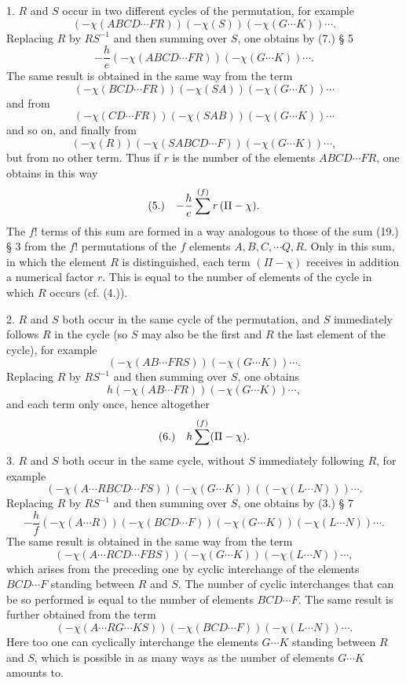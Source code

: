 \documentclass[11pt]{article}
\makeatletter
\newcommand{\frobtagc}[2]{\[\begin{array}{@{}r@{\quad}c@{}}\textup{(#1)} & \displaystyle #2\end{array}\]}
\makeatother
\begin{document}
1. $R$ and $S$ occur in two different cycles of the permutation, for example
\[
(-\chi(ABCD\cdots FR))(-\chi(S))(-\chi(G\cdots K))\cdots .
\]
Replacing $R$ by $RS^{-1}$ and then summing over $S$, one obtains by (7.) § 5
\[
-\frac{h}{e}(-\chi(ABCD\cdots FR))(-\chi(G\cdots K))\cdots .
\]
The same result is obtained in the same way from the term
\[
(-\chi(BCD\cdots FR))(-\chi(SA))(-\chi(G\cdots K))\cdots
\]
and from
\[
(-\chi(CD\cdots FR))(-\chi(SAB))(-\chi(G\cdots K))\cdots
\]
and so on, and finally from
\[
(-\chi(R))(-\chi(SABCD\cdots F))(-\chi(G\cdots K))\cdots,
\]
but from no other term. Thus if $r$ is the number of the elements $ABCD\cdots FR$, one obtains in this way
\frobtagc{5.}{-\frac{h}{e}\sum^{(f)}r\,(\Pi-\chi).}
The $f!$ terms of this sum are formed in a way analogous to those of the sum (19.) § 3 from the $f!$ permutations of the $f$ elements $A,B,C,\cdots Q,R$. Only in this sum, in which the element $R$ is distinguished, each term $(\Pi-\chi)$ receives in addition a numerical factor $r$. This is equal to the number of elements of the cycle in which $R$ occurs (cf. (4.)).

2. $R$ and $S$ both occur in the same cycle of the permutation, and $S$ immediately follows $R$ in the cycle (so $S$ may also be the first and $R$ the last element of the cycle), for example
\[
(-\chi(AB\cdots FRS))(-\chi(G\cdots K))\cdots .
\]
Replacing $R$ by $RS^{-1}$ and then summing over $S$, one obtains
\[
h(-\chi(AB\cdots FR))(-\chi(G\cdots K))\cdots,
\]
and each term only once, hence altogether
\frobtagc{6.}{h\sum^{(f)}(\Pi-\chi).}
3. $R$ and $S$ both occur in the same cycle, without $S$ immediately following $R$, for example
\[
(-\chi(A\cdots RBCD\cdots FS))(-\chi(G\cdots K))((-\chi(L\cdots N)))\cdots .
\]
Replacing $R$ by $RS^{-1}$ and then summing over $S$, one obtains by (3.) § 7
\[
-\frac{h}{f}(-\chi(A\cdots R))(-\chi(BCD\cdots F))(-\chi(G\cdots K))(-\chi(L\cdots N))\cdots .
\]
The same result is obtained in the same way from the term
\[
(-\chi(A\cdots RCD\cdots FBS))(-\chi(G\cdots K))(-\chi(L\cdots N))\cdots,
\]
which arises from the preceding one by cyclic interchange of the elements $BCD\cdots F$ standing between $R$ and $S$. The number of cyclic interchanges that can be so performed is equal to the number of elements $BCD\cdots F$. The same result is further obtained from the term
\[
(-\chi(A\cdots RG\cdots KS))(-\chi(BCD\cdots F))(-\chi(L\cdots N))\cdots .
\]
Here too one can cyclically interchange the elements $G\cdots K$ standing between $R$ and $S$, which is possible in as many ways as the number of elements $G\cdots K$ amounts to.
\end{document}
